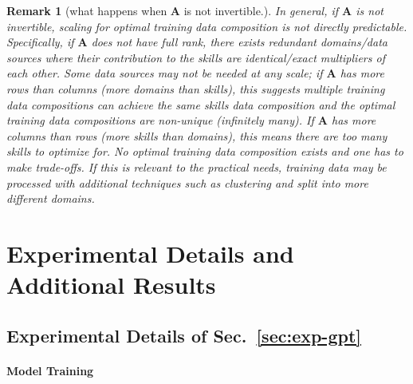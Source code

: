 \documentclass{article} %
\newtheorem{remark}{Remark}
\begin{document}
\begin{appendices}{}




    


\begin{remark} [what happens when $\mathbf{A}$ is not invertible.]
In general, if $\mathbf{A}$ is not invertible, scaling for optimal training data composition is not directly predictable. Specifically, if $\mathbf{A}$ does not have full rank, there exists redundant domains/data sources where their contribution to the skills are identical/exact multipliers of each other. Some data sources may not be needed at any scale; if $\mathbf{A}$ has more rows than columns (more domains than skills), this suggests multiple training data compositions can achieve the same skills data composition and the optimal training data compositions are non-unique (infinitely many).
If $\mathbf{A}$ has more columns than rows (more skills than domains), this means there are too many skills to optimize for. No optimal training data composition exists and one has to make trade-offs. If this is relevant to the practical needs, training data may be processed with additional techniques such as clustering and split into more different domains.
\end{remark}

\section{Experimental Details and Additional Results}
\subsection{Experimental Details of Sec.~\ref{sec:exp-gpt}}
\label{sec:appendix_exp_details_gpt}
\paragraph{Model Training}


\end{appendices}
\end{document}
